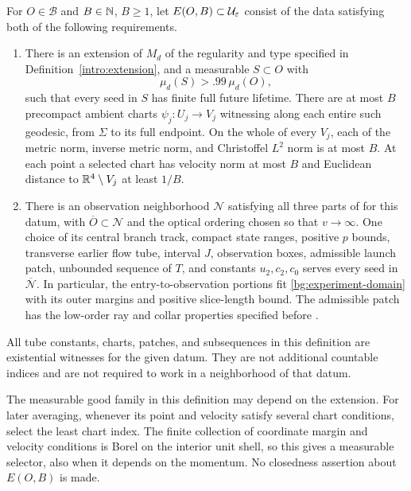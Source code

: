\begin{definition}
\label{def:exit-test}
For $O\in\mathcal B$ and $B\in\mathbb N$, $B\ge1$, let
$E(O,B)\subset\mathcal U_{\varepsilon}$ consist of the data satisfying both
of the following requirements.
\begin{enumerate}[label=(\roman*)]
\item There is an extension of $M_d$ of the regularity and
      type specified in Definition~\ref{intro:extension}, and a measurable
      $S\subset O$ with
      \begin{equation}\label{ex:density-test}
                       \mu_d(S)>.99\,\mu_d(O),
      \end{equation}
      such that every seed in $S$ has finite full future
      lifetime.  There are at most $B$ precompact ambient
      charts $\psi_j:U_j\to V_j$ witnessing
       along each entire such geodesic,
      from $\Sigma$ to its full endpoint.  On the whole of
      every $V_j$, each of the metric norm, inverse metric
      norm, and Christoffel $L^2$ norm is at most $B$.
      At each point a selected chart has velocity norm at
      most $B$ and Euclidean distance to
      $\mathbb R^4\setminus V_j$ at least $1/B$.
\item There is an observation neighborhood $\mathcal N$ satisfying all three
      parts of  for this datum, with
      $\overline O\subset\mathcal N$ and the optical ordering chosen so that
      $v\to\infty$.
      One choice of its central branch track, compact state ranges,
      positive $p$ bounds, transverse earlier flow tube, interval $J$,
      observation boxes, admissible launch patch, unbounded sequence of
      $T$, and constants $u_2,c_2,c_0$ serves every seed in $\overline{\mathcal N}$.
      In particular,
      the entry-to-observation portions fit
      \eqref{bg:experiment-domain} with its outer margins and positive
      slice-length bound. The admissible patch has the low-order ray
      and collar properties specified before .
\end{enumerate}
All tube constants, charts, patches, and subsequences in this
definition are existential witnesses for the given datum.
They are not additional countable indices and are not
required to work in a neighborhood of that datum.
\end{definition}

The measurable good family in this definition may depend on
the extension.  For later averaging, whenever its point and
velocity satisfy several chart conditions, select the least
chart index.  The finite collection of coordinate margin and
velocity conditions is Borel on the interior unit shell, so
this gives a measurable selector, also when it depends on the
momentum.  No closedness assertion about $E(O,B)$ is made.

